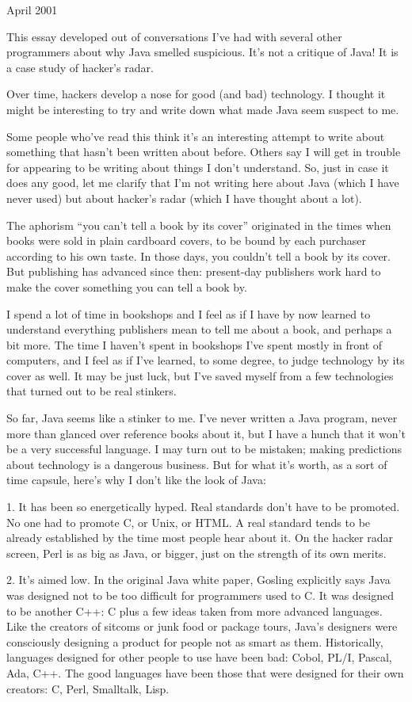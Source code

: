 April 2001

This essay developed out of conversations I've had with several other
programmers about why Java smelled suspicious. It's not a critique of
Java! It is a case study of hacker's radar.

Over time, hackers develop a nose for good (and bad) technology. I
thought it might be interesting to try and write down what made Java
seem suspect to me.

Some people who've read this think it's an interesting attempt to write
about something that hasn't been written about before. Others say I will
get in trouble for appearing to be writing about things I don't
understand. So, just in case it does any good, let me clarify that I'm
not writing here about Java (which I have never used) but about hacker's
radar (which I have thought about a lot).

The aphorism ``you can't tell a book by its cover'' originated in the
times when books were sold in plain cardboard covers, to be bound by
each purchaser according to his own taste. In those days, you couldn't
tell a book by its cover. But publishing has advanced since then:
present-day publishers work hard to make the cover something you can
tell a book by.

I spend a lot of time in bookshops and I feel as if I have by now
learned to understand everything publishers mean to tell me about a
book, and perhaps a bit more. The time I haven't spent in bookshops I've
spent mostly in front of computers, and I feel as if I've learned, to
some degree, to judge technology by its cover as well. It may be just
luck, but I've saved myself from a few technologies that turned out to
be real stinkers.

So far, Java seems like a stinker to me. I've never written a Java
program, never more than glanced over reference books about it, but I
have a hunch that it won't be a very successful language. I may turn out
to be mistaken; making predictions about technology is a dangerous
business. But for what it's worth, as a sort of time capsule, here's why
I don't like the look of Java:

1. It has been so energetically hyped. Real standards don't have to be
promoted. No one had to promote C, or Unix, or HTML. A real standard
tends to be already established by the time most people hear about it.
On the hacker radar screen, Perl is as big as Java, or bigger, just on
the strength of its own merits.

2. It's aimed low. In the original Java white paper, Gosling explicitly
says Java was designed not to be too difficult for programmers used to
C. It was designed to be another C++: C plus a few ideas taken from more
advanced languages. Like the creators of sitcoms or junk food or package
tours, Java's designers were consciously designing a product for people
not as smart as them. Historically, languages designed for other people
to use have been bad: Cobol, PL/I, Pascal, Ada, C++. The good languages
have been those that were designed for their own creators: C, Perl,
Smalltalk, Lisp.

